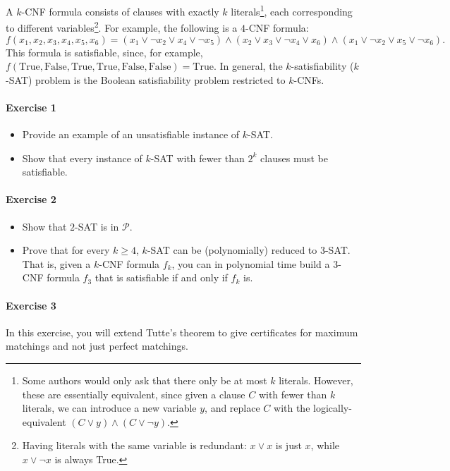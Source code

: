 \documentclass[a4paper,12pt]{article}
\newcommand{\mc}[1]{\mathcal{#1}}
\begin{document}
A $k$-CNF formula consists of clauses with exactly $k$ literals\footnote{Some authors would only ask that there only be at most $k$ literals.  However, these are essentially equivalent, since given a clause $C$ with fewer than $k$ literals, we can introduce a new variable $y$, and replace $C$ with the logically-equivalent $(C \vee y) \wedge (C \vee \neg y)$.}, each corresponding to different variables\footnote{Having literals with the same variable is redundant: $x \vee x$ is just $x$, while $x \vee \neg x$ is always True.}.  For example, the following is a $4$-CNF formula:
\[ f(x_1, x_2, x_3, x_4, x_5, x_6) = \left( x_1 \vee \neg x_2 \vee x_4 \vee \neg x_5 \right) \wedge \left(x_2 \vee x_3 \vee \neg x_4 \vee x_6 \right) \wedge \left( x_1 \vee \neg x_2 \vee x_5 \vee \neg x_6 \right).\]
This formula is satisfiable, since, for example, $f(\textrm{True},\textrm{False}, \textrm{True}, \textrm{True}, \textrm{False}, \textrm{False}) = \textrm{True}$.  In general, the $k$-satisfiability ($k$-SAT) problem is the Boolean satisfiability problem restricted to $k$-CNFs.

\paragraph{Exercise 1}
\begin{itemize}
	\item[(a)] Provide an example of an unsatisfiable instance of $k$-SAT.
	\item[(b)] Show that every instance of $k$-SAT with fewer than $2^k$ clauses must be satisfiable.
\end{itemize}

\paragraph{Exercise 2}  
\begin{itemize}
	\item[(a)] Show that $2$-SAT is in $\mc P$.
	\item[(b)] Prove that for every $k \ge 4$, $k$-SAT can be (polynomially) reduced to $3$-SAT. That is, given a $k$-CNF formula $f_k$, you can in polynomial time build a $3$-CNF formula $f_3$ that is satisfiable if and only if $f_k$ is. 
\end{itemize}

\paragraph{Exercise 3}  In this exercise, you will extend Tutte's theorem to give certificates for maximum matchings and not just perfect matchings.
\end{document}
